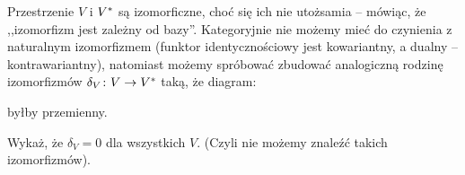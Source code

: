 {\begin{exc}
  \label{exc:dual_nat_iso}
  Przestrzenie $V$ i ${V}^{*}$ są izomorficzne, choć się ich nie utożsamia -- mówiąc, że ,,izomorfizm jest zależny od bazy''. Kategoryjnie nie możemy mieć do czynienia z naturalnym izomorfizmem (funktor identycznościowy jest kowariantny, a dualny -- kontrawariantny), natomiast możemy spróbować zbudować analogiczną rodzinę izomorfizmów $\delta_V\colon V\to {V}^{*}$ taką, że diagram:
  \begin{center}
  \end{center}
  byłby przemienny.

  Wykaż, że $\delta_V=0$ dla wszystkich $V$. (Czyli nie możemy znaleźć takich izomorfizmów).
\end{exc}

%
%
%
}
